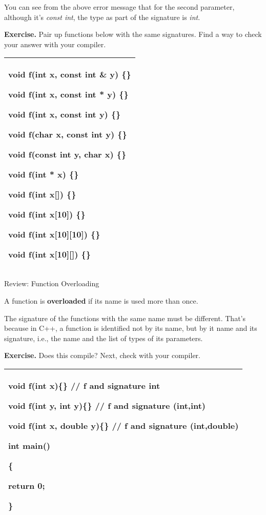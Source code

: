 \documentclass[
]{article}
\begin{document}
\begin{longtable}[]{@{}@{}}
\toprule
\endhead
\bottomrule
\end{longtable}

You can see from the above error message that for the second parameter,
although it's \emph{const int}, the type as part of the signature is
\emph{int}.

\textbf{Exercise. }Pair up functions below with the same signatures.
Find a way to check your answer with your compiler.

\begin{longtable}[]{@{}l@{}}
\toprule
\endhead
\begin{minipage}[t]{0.97\columnwidth}\raggedright
void f(int x, const int \& y) \{\}

void f(int x, const int * y) \{\}

void f(int x, const int y) \{\}

void f(char x, const int y) \{\}

void f(const int y, char x) \{\}

void f(int * x) \{\}

void f(int x{[}{]}) \{\}

void f(int x{[}10{]}) \{\}

void f(int x{[}10{]}{[}10{]}) \{\}

void f(int x{[}10{]}{[}{]}) \{\}\strut
\end{minipage}\tabularnewline
\bottomrule
\end{longtable}

Review: Function Overloading

A function is \textbf{overloaded} if its name is used more than once.

The signature of the functions with the same name must be different.
That's because in C++, a function is identified not by its name, but by
it name and its signature, i.e., the name and the list of types of its
parameters.

\textbf{Exercise.} Does this compile? Next, check with your compiler.

\begin{longtable}[]{@{}l@{}}
\toprule
\endhead
\begin{minipage}[t]{0.97\columnwidth}\raggedright
void f(int x)\{\} // f and signature int

void f(int y, int y)\{\} // f and signature (int,int)

void f(int x, double y)\{\} // f and signature (int,double)

int main()

\{

return 0;

\}\strut
\end{minipage}\tabularnewline
\bottomrule
\end{longtable}
\end{document}
